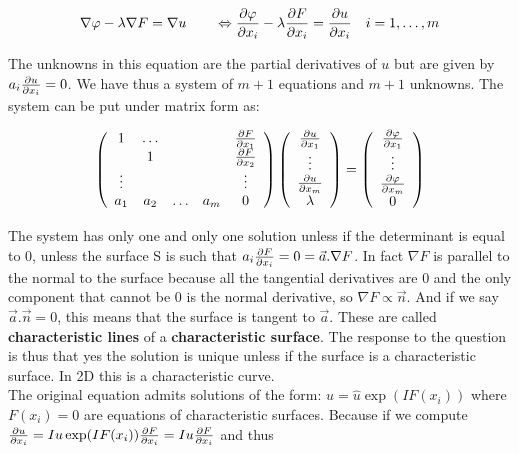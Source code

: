 \begin{equation}
\nabla \varphi - \lambda \nabla F = \nabla u \qquad \Leftrightarrow \frac{\partial \varphi}{\partial x_i } - \lambda \frac{\partial F}{\partial x_i } = \frac{\partial u}{\partial x_i} \quad i = 1,\dots, m
\end{equation} 

The unknowns in this equation are the partial derivatives of $u$ but are given by $a_i \frac{\partial u}{\partial x_i} = 0$. We have thus a system of $m+1$ equations and $m+1$ unknowns. The system can be put under matrix form as:

\begin{equation}
\left(
\begin{array}{ccccc}
1 & \dots & & & \frac{\partial F}{\partial x_1} \\
 & 1 &  & & \frac{\partial F}{\partial x_2}\\
 \vdots & & & & \vdots \\
 a_1 & a_2 & \dots & a_m & 0
\end{array}
\right)
\left(
\begin{array}{c}
\frac{\partial u}{\partial x_1}\\
\vdots\\
\frac{\partial u}{\partial x_m}\\
\lambda
\end{array}
\right)
=
\left(
\begin{array}{c}
\frac{\partial \varphi}{\partial x_1}\\
\vdots\\
\frac{\partial \varphi}{\partial x_m}\\
0
\end{array}
\right)
\end{equation}

The system has only one and only one solution unless if the determinant is equal to 0, unless the surface S is such that $a_i \frac{\partial F}{\partial x_i} = 0 = \vec{a}.\nabla F$. In fact $\nabla F$ is parallel to the normal to the surface because all the tangential derivatives are 0 and the only component that cannot be 0 is the normal derivative, so $\nabla F \propto \vec{n}$. And if we say $\vec{a}.\vec{n} = 0$,
this means that the surface is tangent to $\vec{a}$. These are called \textbf{characteristic lines} of a \textbf{characteristic surface}. The response to the question is thus that yes the solution is unique unless if the surface is a characteristic surface. In 2D this is a characteristic curve. \\

The original equation admits solutions of the form: $u = \hat{u}\exp (IF(x_i))$ where $F(x_i) = 0$ are equations of characteristic surfaces. Because if we compute $\frac{\partial u}{\partial x_i} = I u \exp (IF(x _i))\frac{\partial F}{\partial x_i} = Iu\frac{\partial F}{\partial x_i}$ and thus 


